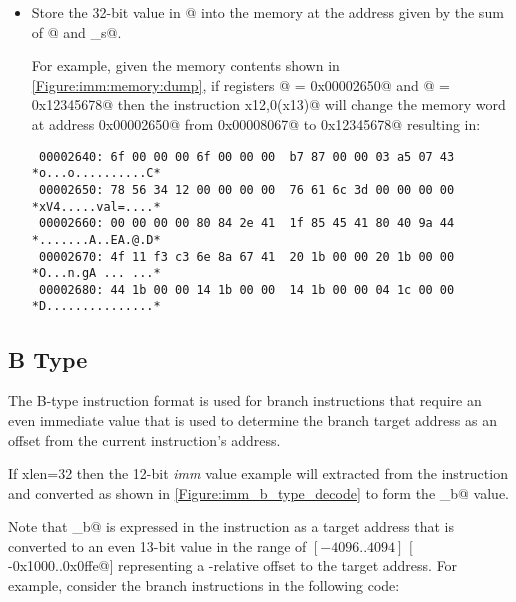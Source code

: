 \begin{itemize}
\item{}
\label{insn:sw}

Store the 32-bit value in @ into the memory at the address given 
by the sum of @ and \verb@imm_s@.

For example, given the memory contents shown in \autoref{Figure:imm:memory:dump},
if registers @ = \verb@0x00002650@ and @ = \verb@0x12345678@
then the instruction \verb@sw x12,0(x13)@ will change the memory word at address 
\verb@0x00002650@ from \verb@0x00008067@ to \verb@0x12345678@ resulting in:

\begin{verbatim}
 00002640: 6f 00 00 00 6f 00 00 00  b7 87 00 00 03 a5 07 43 *o...o..........C*
 00002650: 78 56 34 12 00 00 00 00  76 61 6c 3d 00 00 00 00 *xV4.....val=....*
 00002660: 00 00 00 00 80 84 2e 41  1f 85 45 41 80 40 9a 44 *.......A..EA.@.D*
 00002670: 4f 11 f3 c3 6e 8a 67 41  20 1b 00 00 20 1b 00 00 *O...n.gA ... ...*
 00002680: 44 1b 00 00 14 1b 00 00  14 1b 00 00 04 1c 00 00 *D...............*
\end{verbatim}

\end{itemize}

\subsection{B Type}
\label{insnformat:btype}

The B-type instruction format is used for branch instructions that 
require an even immediate value that is used to determine the
branch target address as an offset from the current instruction's
address. 

If \Gls{xlen}=32 then the 12-bit {\em imm} value example will extracted from 
the instruction and converted as shown in \autoref{Figure:imm_b_type_decode}
to form the \verb@imm_b@ value.

\begin{figure}[ht]
\centering
\DrawInsnOpBTypeDecoding
{}
\label{Figure:imm_b_type_decode}
\label{imm.b:decode}
\end{figure}

Note that \verb@imm_b@ is expressed in the instruction as a target 
address that is converted to an even 13-bit value in the range of 
$[-4096..4094]$ $[$\verb@-0x1000..0x0ffe@$]$ representing a \verb@pc@-relative offset to the
target address. For example, consider the branch instructions in
the following code:

